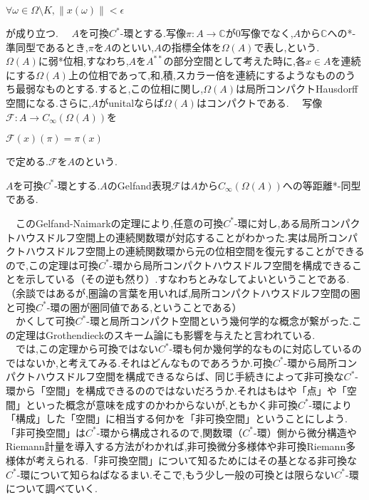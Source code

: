 \begin{center}
$\forall \omega \in \Omega\setminus K,\parallel x\left( \omega\right)\parallel<\epsilon$
\end{center}
が成り立つ.
　$A$を可換$C^*$-環とする.写像$\pi:A\rightarrow\mathbb{C}$が0写像でなく,$A$から$\mathbb{C}$への*-準同型であるとき,$\pi$を$A$のといい,$A$の指標全体を$\Omega\left(A\right)$で表し,という.
　$\Omega\left(A\right)$に弱*位相,すなわち,$A$を$A^{**}$の部分空間として考えた時に,各$x\in A$を連続にする$\Omega\left(A\right)$上の位相であって,和,積,スカラー倍を連続にするようなもののうち最弱なものとする.すると,この位相に関し,$\Omega\left(A\right)$は局所コンパクトHausdorff空間になる.さらに,$A$がunitalならば$\Omega\left(A\right)$はコンパクトである.
　写像$\mathscr{F}:A \rightarrow C_{\infty}\left(\Omega\left(A\right)\right)$を
\begin{center}
$\mathscr{F}\left(x\right)\left(\pi\right)=\pi\left(x\right)$
\end{center}
で定める.$\mathscr{F}$を$A$のという.
\begin{theo}
$A$を可換$C^*$-環とする.$A$の{\rm Gelfand}表現$\mathscr{F}$は$A$から$C_{\infty}\left(\Omega\left(A\right)\right)$への等距離*-同型である.
\end{theo}
　このGelfand-Naimarkの定理により,任意の可換$C^*$-環に対し,ある局所コンパクトハウスドルフ空間上の連続関数環が対応することがわかった.実は局所コンパクトハウスドルフ空間上の連続関数環から元の位相空間を復元することができるので,この定理は可換$C^*$-環から局所コンパクトハウスドルフ空間を構成できることを示している（その逆も然り）.すなわちとみなしてよいということである.（余談ではあるが,圏論の言葉を用いれば,局所コンパクトハウスドルフ空間の圏と可換$C^*$-環の圏が圏同値である,ということである）\\
　かくして可換$C^*$-環と局所コンパクト空間という幾何学的な概念が繋がった.この定理はGrothendieckのスキーム論にも影響を与えたと言われている.\\
　では,この定理から可換ではない$C^*$-環も何か幾何学的なものに対応しているのではないか,と考えてみる.それはどんなものであろうか.可換$C^*$-環から局所コンパクトハウスドルフ空間を構成できるならば、同じ手続きによって非可換な$C^*$-環から「空間」を構成できるののではないだろうか.それはもはや「点」や「空間」といった概念が意味を成すのかわからないが,ともかく非可換$C^*$-環により「構成」した「空間」に相当する何かを「非可換空間」ということにしよう.「非可換空間」は$C^*$-環から構成されるので,関数環（$C^*$-環）側から微分構造やRiemann計量を導入する方法がわかれば,非可換微分多様体や非可換Riemann多様体が考えられる.「非可換空間」について知るためにはその基となる非可換な$C^*$-環について知らねばなるまい.そこで,もう少し一般の可換とは限らない$C^*$-環について調べていく.

